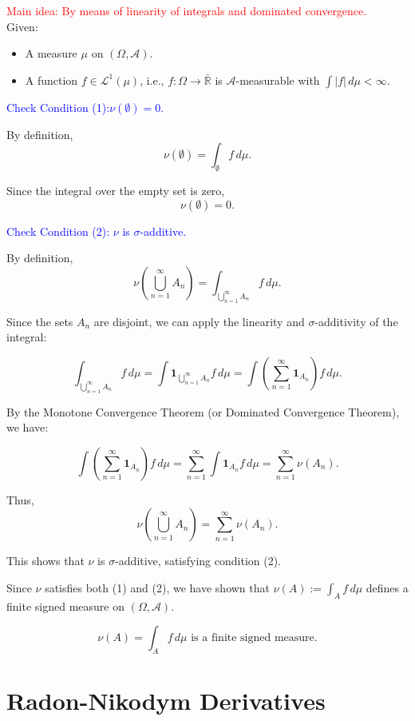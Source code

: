 \documentclass{report}
\begin{document}
\begin{myproof}
    \textcolor{red}{Main idea: By means of linearity of integrals and dominated convergence.}\\
Given:
\begin{itemize}
    \item A measure \(\mu\) on \((\Omega, \mathcal{A})\).
    \item A function \(f \in \mathcal{L}^1(\mu)\), i.e., \(f: \Omega \to \bar{\mathbb{R}}\) is \(\mathcal{A}\)-measurable with \(\int |f| \, d\mu < \infty\).
\end{itemize}

\textcolor{blue}{Check Condition (1):\(\nu(\emptyset) = 0\).}

By definition,
\[ \nu(\emptyset) = \int_\emptyset f \, d\mu. \]

Since the integral over the empty set is zero,
\[ \nu(\emptyset) = 0. \]

\textcolor{blue}{Check Condition (2): \(\nu\) is \(\sigma\)-additive.}

By definition,
\[ \nu\left(\bigcup_{n=1}^\infty A_n\right) = \int_{\bigcup_{n=1}^\infty A_n} f \, d\mu. \]

Since the sets \(A_n\) are disjoint, we can apply the linearity and \(\sigma\)-additivity of the integral:

\[ \int_{\bigcup_{n=1}^\infty A_n} f \, d\mu = \int \mathbf{1}_{\bigcup_{n=1}^\infty A_n} f \, d\mu = \int \left( \sum_{n=1}^\infty \mathbf{1}_{A_n} \right) f \, d\mu. \]

By the Monotone Convergence Theorem (or Dominated Convergence Theorem), we have:

\[ \int \left( \sum_{n=1}^\infty \mathbf{1}_{A_n} \right) f \, d\mu = \sum_{n=1}^\infty \int \mathbf{1}_{A_n} f \, d\mu = \sum_{n=1}^\infty \nu(A_n). \]

Thus,
\[ \nu\left(\bigcup_{n=1}^\infty A_n\right) = \sum_{n=1}^\infty \nu(A_n). \]

This shows that \(\nu\) is \(\sigma\)-additive, satisfying condition (2).

Since \(\nu\) satisfies both (1) and (2), we have shown that \(\nu(A) := \int_A f \, d\mu\) defines a finite signed measure on \((\Omega, \mathcal{A})\).

\[
\boxed{\nu(A) = \int_A f \, d\mu \text{ is a finite signed measure.}}
\]
\end{myproof}

\section{Radon-Nikodym Derivatives}
\end{document}
